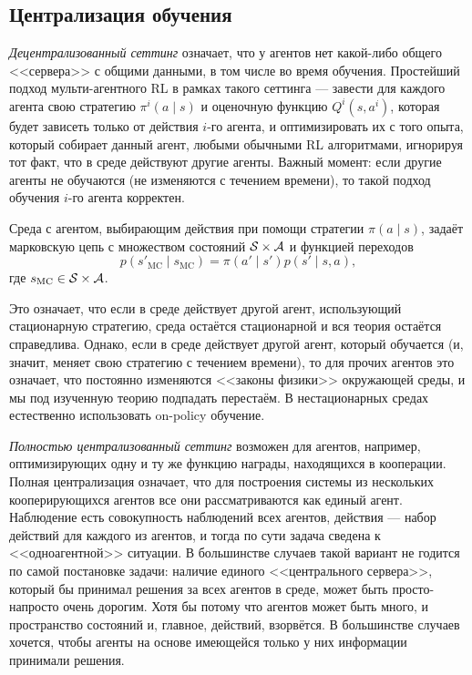\subsection{Централизация обучения}

\emph{Децентрализованный сеттинг} означает, что у агентов нет какой-либо общего <<сервера>> с общими данными, в том числе во время обучения. Простейший подход мульти-агентного RL в рамках такого сеттинга --- завести для каждого агента свою стратегию $\pi^i(a \mid s)$ и оценочную функцию $Q^i(s, a^i)$, которая будет зависеть только от действия $i$-го агента, и оптимизировать их с того опыта, который собирает данный агент, любыми обычными RL алгоритмами, игнорируя тот факт, что в среде действуют другие агенты. Важный момент: если другие агенты не обучаются (не изменяются с течением времени), то такой подход обучения $i$-го агента корректен.

\begin{proposition}
Среда с агентом, выбирающим действия при помощи стратегии $\pi(a \mid s)$, задаёт марковскую цепь с множеством состояний $\mathcal{S} \times \mathcal{A}$ и функцией переходов
$$p(s'_{\mathrm{MC}} \mid s_{\mathrm{MC}}) = \pi(a' \mid s')p(s' \mid s, a),$$
где $s_{\mathrm{MC}} \in \mathcal{S} \times \mathcal{A}$.
\end{proposition}

Это означает, что если в среде действует другой агент, использующий стационарную стратегию, среда остаётся стационарной и вся теория остаётся справедлива. Однако, если в среде действует другой агент, который обучается (и, значит, меняет свою стратегию с течением времени), то для прочих агентов это означает, что постоянно изменяются <<законы физики>> окружающей среды, и мы под изученную теорию подпадать перестаём. В нестационарных средах естественно использовать on-policy обучение.

\emph{Полностью централизованный сеттинг} возможен для агентов, например, оптимизирующих одну и ту же функцию награды, находящихся в кооперации. Полная централизация означает, что для построения системы из нескольких кооперирующихся агентов все они рассматриваются как единый агент. Наблюдение есть совокупность наблюдений всех агентов, действия --- набор действий для каждого из агентов, и тогда по сути задача сведена к <<одноагентной>> ситуации. В большинстве случаев такой вариант не годится по самой постановке задачи: наличие единого <<центрального сервера>>, который бы принимал решения за всех агентов в среде, может быть просто-напросто очень дорогим. Хотя бы потому что агентов может быть много, и пространство состояний и, главное, действий, взорвётся. В большинстве случаев хочется, чтобы агенты на основе имеющейся только у них информации принимали решения.

